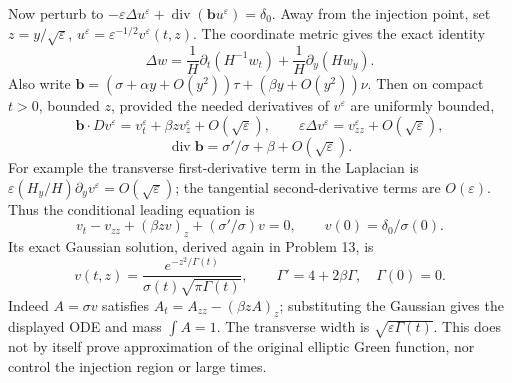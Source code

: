 Now perturb to $-\varepsilon\Delta u^\varepsilon+
\operatorname{div}(\mathbf b u^\varepsilon)=\delta_0$.
Away from the injection point, set
$z=y/\sqrt\varepsilon$,
$u^\varepsilon=\varepsilon^{-1/2}v^\varepsilon(t,z)$.
The coordinate metric gives the exact identity
\[
 \Delta w=\frac1H\partial_t(H^{-1}w_t)
                  +\frac1H\partial_y(Hw_y).
\]
Also write
$\mathbf b=(\sigma+\alpha y+O(y^2))\tau+
(\beta y+O(y^2))\nu$.
Then on compact $t>0$, bounded $z$, provided the needed derivatives
of $v^\varepsilon$ are uniformly bounded,
\[
 \mathbf b\cdot Dv^\varepsilon
       =v^\varepsilon_t+\beta z v^\varepsilon_z+O(\sqrt\varepsilon),
 \qquad
 \varepsilon\Delta v^\varepsilon=v^\varepsilon_{zz}+O(\sqrt\varepsilon),
\]
\[
 \operatorname{div}\mathbf b
       =\sigma'/\sigma+\beta+O(\sqrt\varepsilon).
\]
For example the transverse first-derivative term in the Laplacian
is $\varepsilon(H_y/H)\partial_yv^\varepsilon=O(\sqrt\varepsilon)$;
the tangential second-derivative terms are $O(\varepsilon)$.
Thus the conditional leading equation is
\[
 v_t-v_{zz}+(\beta z v)_z+(\sigma'/\sigma)v=0,\qquad
 v(0)=\delta_0/\sigma(0).
 \tag{PL4}
\]
Its exact Gaussian solution, derived again in Problem 13, is
\[
 v(t,z)=\frac{e^{-z^2/\Gamma(t)}}{\sigma(t)\sqrt{\pi\Gamma(t)}},
 \qquad \Gamma'=4+2\beta\Gamma,\quad\Gamma(0)=0 .
\]
Indeed $A=\sigma v$ satisfies $A_t=A_{zz}-(\beta zA)_z$;
substituting the Gaussian gives the displayed ODE and mass $\int A=1$.
The transverse width is $\sqrt{\varepsilon\Gamma(t)}$.
This does not by itself prove approximation of the original elliptic
Green function, nor control the injection region or large times.
\Needspace{45mm}

\Needspace{35mm}
